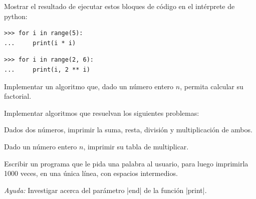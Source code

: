 \begin{ejercicio}
Mostrar el resultado de ejecutar estos bloques de código en el
intérprete de python:
\begin{partes}
\item \begin{verbatim}
>>> for i in range(5):
...     print(i * i)
\end{verbatim}
\item \begin{verbatim}
>>> for i in range(2, 6):
...     print(i, 2 ** i)
\end{verbatim}
\end{partes}
\end{ejercicio}

\begin{ejercicio} Implementar un algoritmo que, dado un número entero $n$,
    permita calcular su factorial.
\end{ejercicio}

\begin{ejercicio} Implementar algoritmos que resuelvan los siguientes
problemas:
\begin{partes}
  \item Dados dos números, imprimir la suma, resta, división y multiplicación
  de ambos.
  \item Dado un número entero $n$, imprimir su tabla de multiplicar.
\end{partes}
\end{ejercicio}

\begin{ejercicio}
Escribir un programa que le pida una palabra al usuario, para luego
imprimirla 1000 veces, en una única línea, con espacios intermedios.

\emph{Ayuda:} Investigar acerca del parámetro |end| de la función |print|.
\end{ejercicio}
